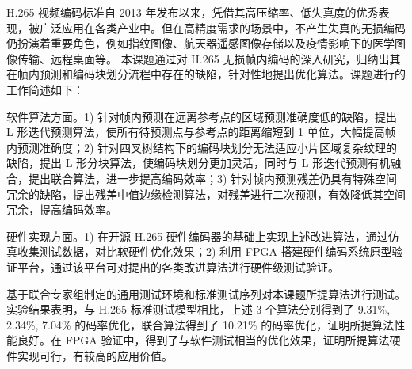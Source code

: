 \begin{cabstract}
    H.265 视频编码标准自 2013 年发布以来，凭借其高压缩率、低失真度的优秀表现，被广泛应用在各类产业中。但在高精度需求的场景中，不产生失真的无损编码仍扮演着重要角色，例如指纹图像、航天器遥感图像存储以及疫情影响下的医学图像传输、远程桌面等。    
    本课题通过对 H.265 无损帧内编码的深入研究，归纳出其在帧内预测和编码块划分流程中存在的缺陷，针对性地提出优化算法。课题进行的工作简述如下：

    软件算法方面。1) 针对帧内预测在远离参考点的区域预测准确度低的缺陷，提出 L 形迭代预测算法，使所有待预测点与参考点的距离缩短到 1 单位，大幅提高帧内预测准确度；2) 针对四叉树结构下的编码块划分无法适应小片区域复杂纹理的缺陷，提出 L 形分块算法，使编码块划分更加灵活，同时与 L 形迭代预测有机融合，提出联合算法，进一步提高编码效率；3) 针对帧内预测残差仍具有特殊空间冗余的缺陷，提出残差中值边缘检测算法，对残差进行二次预测，有效降低其空间冗余，提高编码效率。

    硬件实现方面。1) 在开源 H.265 硬件编码器的基础上实现上述改进算法，通过仿真收集测试数据，对比软硬件优化效果；2) 利用 FPGA 搭建硬件编码系统原型验证平台，通过该平台可对提出的各类改进算法进行硬件级测试验证。

    基于联合专家组制定的通用测试环境和标准测试序列对本课题所提算法进行测试。实验结果表明，与 H.265 标准测试模型相比，上述 3 个算法分别得到了 9.31\%, 2.34\%, 7.04\% 的码率优化，联合算法得到了 10.21\% 的码率优化，证明所提算法性能良好。在 FPGA 验证中，得到了与软件测试相当的优化效果，证明所提算法硬件实现可行，有较高的应用价值。
\end{cabstract}


